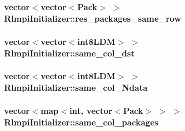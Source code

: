 \hypertarget{classRlmpiInitializer_a1f7bed6d1cfc17f69638cd94a066308a}{
\subsubsection[{res\_\-packages\_\-same\_\-row}]{\setlength{\rightskip}{0pt plus 5cm}vector$<$vector$<$Pack$>$ $>$ {\bf RlmpiInitializer::res\_\-packages\_\-same\_\-row}}}
\label{classRlmpiInitializer_a1f7bed6d1cfc17f69638cd94a066308a}
\hypertarget{classRlmpiInitializer_a1bde89fc33eccd4ca66492cfb4d35934}{
\subsubsection[{same\_\-col\_\-dst}]{\setlength{\rightskip}{0pt plus 5cm}vector$<$vector$<${\bf int8LDM}$>$ $>$ {\bf RlmpiInitializer::same\_\-col\_\-dst}}}
\label{classRlmpiInitializer_a1bde89fc33eccd4ca66492cfb4d35934}
\hypertarget{classRlmpiInitializer_a1b825243c5e0676e04d16385f22e445e}{
\subsubsection[{same\_\-col\_\-Ndata}]{\setlength{\rightskip}{0pt plus 5cm}vector$<$vector$<${\bf int8LDM}$>$ $>$ {\bf RlmpiInitializer::same\_\-col\_\-Ndata}}}
\label{classRlmpiInitializer_a1b825243c5e0676e04d16385f22e445e}
\hypertarget{classRlmpiInitializer_aca6b4f6dcecf079c054faec1d043a884}{
\subsubsection[{same\_\-col\_\-packages}]{\setlength{\rightskip}{0pt plus 5cm}vector$<$map$<$int, vector$<$Pack$>$ $>$ $>$ {\bf RlmpiInitializer::same\_\-col\_\-packages}}}

